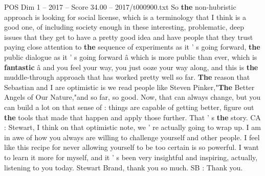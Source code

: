\begin{textsample}{POS Dim 1 – 2017 – Score 34.00 – 2017/t000900.txt}
So \textbf{the} non-hubristic approach is looking for social license, which is a terminology that I think is a good one, of including society enough in these interesting, problematic, deep issues that they get to have a pretty good idea and have people that they trust paying close attention to \textbf{the} sequence of experiments as it ' s going forward, \textbf{the} public dialogue as it ' s going forward â which is more public than ever, which is \textbf{fantastic} â and you feel your way, you just ooze your way along, and this is \textbf{the} muddle-through approach that has worked pretty well so far. \textbf{The} reason that Sebastian and I are optimistic is we read people like Steven Pinker,"\textbf{The} Better Angels of Our Nature,"and so far, so good.
Now, that can always change, but you can build a lot on that sense of : things are capable of getting better, figure out \textbf{the} tools that made that happen and apply those further.
That ' s \textbf{the} story.
CA : Stewart, I think on that optimistic note, we ' re actually going to wrap up.
I am in awe of how you always are willing to challenge yourself and other people.
I feel like this recipe for never allowing yourself to be too certain is so powerful.
I want to learn it more for myself, and it ' s been very insightful and inspiring, actually, listening to you today.
Stewart Brand, thank you so much.
SB : Thank you.

\end{textsample}

